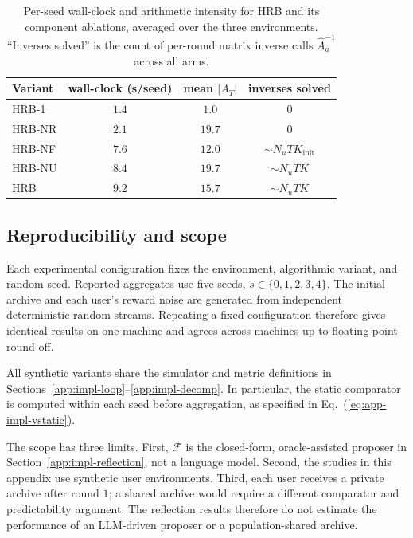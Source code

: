 \documentclass{article} %
\renewcommand{\eqref}[1]{\textup{(\ref{#1})}}
\begin{document}
\begin{table}[h]
\centering
\small
\begin{tabular}{lccc}
\toprule
Variant & wall-clock (s/seed) & mean $|A_T|$ & inverses solved \\
\midrule
\textnormal{HRB-1}        & $1.4$ & $1.0$  & $0$ \\
\textnormal{HRB-NR}        & $2.1$ & $19.7$ & $0$ \\
\textnormal{HRB-NF}     & $7.6$ & $12.0$ & $\sim N_u T K_{\text{init}}$ \\
\textnormal{HRB-NU}& $8.4$ & $19.7$ & $\sim N_u T \bar K$ \\
\textnormal{HRB}               & $9.2$ & $15.7$ & $\sim N_u T \bar K$ \\
\bottomrule
\end{tabular}
\caption{Per-seed wall-clock and arithmetic intensity for HRB and its component ablations, averaged over the three environments. ``Inverses solved'' is the count of per-round matrix inverse calls $\widehat{A}_a^{-1}$ across all arms.}
\label{tab:app-impl-runtime}
\end{table}

\subsection{Reproducibility and scope}

\label{app:impl-repro}
\label{app:impl-not-included}

Each experimental configuration fixes the environment, algorithmic variant,
and random seed. Reported aggregates use five seeds, \(s\in\{0,1,2,3,4\}\).
The initial archive and each user's reward noise are generated from independent
deterministic random streams. Repeating a fixed configuration therefore gives
identical results on one machine and agrees across machines up to floating-point
round-off.

All synthetic variants share the simulator and metric definitions in
Sections~\ref{app:impl-loop}--\ref{app:impl-decomp}. In particular, the static
comparator is computed within each seed before aggregation, as specified in
Eq.~\eqref{eq:app-impl-vstatic}.

The scope has three limits. First, \(\mathcal F\) is the closed-form,
oracle-assisted proposer in Section~\ref{app:impl-reflection}, not a language
model. Second, the studies in this appendix use synthetic user environments.
Third, each user receives a private archive after round \(1\); a shared archive
would require a different comparator and predictability argument. The
reflection results therefore do not estimate the performance of an LLM-driven
proposer or a population-shared archive.
\end{document}

